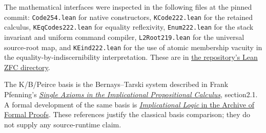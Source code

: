 \documentclass[
  11pt,
]{article}
\begin{document}
The mathematical interfaces were inspected in the following files at the
pinned commit: \texttt{Code254.lean} for native constructors,
\texttt{KCode222.lean} for the retained calculus,
\texttt{KEqCodes222.lean} for equality reflexivity,
\texttt{Enum222.lean} for the stack invariant and uniform command
compiler, \texttt{L2Root219.lean} for the universal source-root map, and
\texttt{KEind222.lean} for the use of atomic membership vacuity in the
equality-by-indiscernibility interpretation. These are in
\href{https://github.com/VladimirReshetnikov/ProveIt/tree/704b87442afbd571833a628cd558f1d207fd8b2f/Computability/BusyBeaver/Lean/BusyBeaver/ZFC}{the
repository's Lean ZFC directory}.

The K/B/Peirce basis is the Bernays--Tarski system described in Frank
Pfenning's
\href{https://www.cs.cmu.edu/~fp/papers/cade88.pdf}{\emph{Single Axioms
in the Implicational Propositional Calculus}}, section2.1. A formal
development of the same basis is
\href{https://isa-afp.org/browser_info/current/AFP/Implicational_Logic/Implicational_Logic.html}{\emph{Implicational
Logic} in the Archive of Formal Proofs}. These references justify the
classical basis comparison; they do not supply any source-runtime claim.
\end{document}
